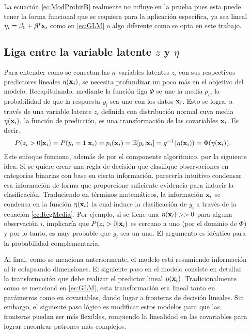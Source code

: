 \documentclass[../Main/Main.tex]{subfiles}
\begin{document}
La ecuación \eqref{ec:ModProbitB} realmente no influye en la prueba pues esta puede tener la forma funcional que se requiera para la aplicación especifica, ya sea lineal $\eta_i = \beta_0 + \bm{\beta}^t\mathbf{x}_i$ como en \eqref{ec:GLM} o algo diferente como se opta en este trabajo.

\subsection*{Liga entre la variable latente $z$ y $\eta$} \label{sec:VarLat}
Para entender como se conectan las $n$ variables latentes $z_i$ con sus respectivos predictores lineales $\eta(\mathbf{x}_i)$, se necesita profundizar un poco más en el objetivo del modelo. Recapitulando, mediante la función liga $\Phi$ se une la media $p_i$, la probabilidad de que la respuesta $y_i$ sea uno con los datos $\mathbf{x}_i$. Esto se logra, a través de una variable latente $z_i$ definida con distribución normal cuya media $\eta(\mathbf{x}_i)$, la función de predicción, es una transformación de las covariables $\mathbf{x}_i$. Es decir,
\begin{align} \label{ec:RegMedia}
	P(z_i > 0|\mathbf{x}_i) = P(y_i = 1|\mathbf{x}_i)= p_i(\mathbf{x}_i) &=\mathbb{E}[y_i|\mathbf{x}_i] = g^{-1}(\eta(\mathbf{x}_i)) = \Phi(\eta(\mathbf{x}_i)).
\end{align}
Este enfoque funciona, además de por el componente algorítmico, por la siguiente idea. Si se quiere crear una regla de decisión que clasifique observaciones en categorías binarias con base en cierta información, parecería intuitivo condensar esa información de forma que proporcione suficiente evidencia para inducir la clasificación. Traduciendo en términos matemáticos, la información $\mathbf{x}_i$ se condensa en la función $\eta(\mathbf{x}_i)$ la cual induce la clasificación de $y_i$ a través de la ecuación \eqref{ec:RegMedia}. Por ejemplo, si se tiene una $\eta(\mathbf{x}_i)>>0$ para alguna observación $i$, implicaría que $P(z_i > 0|\mathbf{x}_i)$ es cercano a uno (por el dominio de $\Phi$) y por lo tanto, es muy probable que $y_i$ sea un uno. El argumento es idéntico para la probabilidad complementaria.

Al final, como se menciona anteriormente, el modelo está resumiendo información al ir colapsando dimensiones. El siguiente paso en el modelo consiste en detallar la transformación que debe realizar el predictor lineal $\eta(\mathbf{x}_i)$. Tradicionalmente como se mencionó en \eqref{ec:GLM}, esta transformación era lineal tanto en parámetros como en covariables, dando lugar a fronteras de decisión lineales. Sin embargo, el siguiente paso lógico es modificar estos modelos para que las fronteras puedan ser más flexibles, rompiendo la linealidad en las covariables para lograr encontrar patrones más complejos. 
\end{document}
